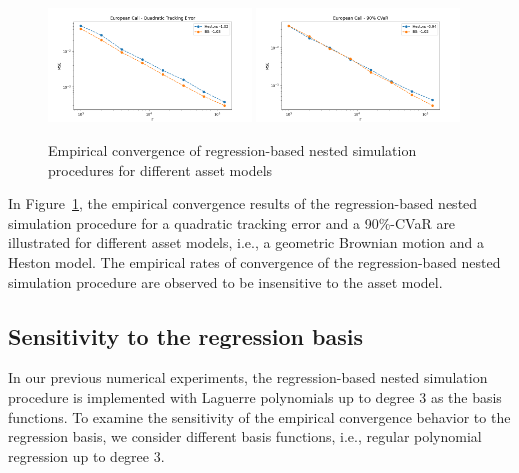 \begin{figure}[ht!] 
    \centering
    \includegraphics[width=0.48\textwidth]{./project1/figures/figure10a.png}
    \includegraphics[width=0.48\textwidth]{./project1/figures/figure10b.png}
    \caption{Empirical convergence of regression-based nested simulation procedures for different asset models}
    \label{fig1:sens_model}
\end{figure}

In Figure~\ref{fig1:sens_model}, the empirical convergence results of the regression-based nested simulation procedure for a quadratic tracking error and a 90\%-CVaR are illustrated for different asset models, i.e., a geometric Brownian motion and a Heston model.
The empirical rates of convergence of the regression-based nested simulation procedure are observed to be insensitive to the asset model.

\subsection{Sensitivity to the regression basis} \label{sec1:sensitivity-basis}

In our previous numerical experiments, the regression-based nested simulation procedure is implemented with Laguerre polynomials up to degree $3$ as the basis functions.
To examine the sensitivity of the empirical convergence behavior to the regression basis, we consider different basis functions, i.e., regular polynomial regression up to degree $3$.

